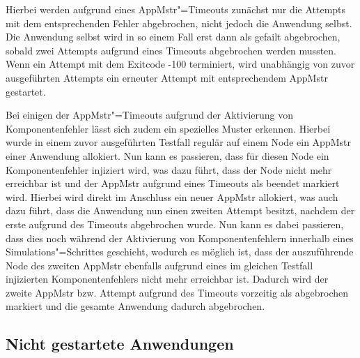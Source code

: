 Hierbei werden aufgrund eines \ac{AppMstr}"=Timeouts zunächst nur die Attempts mit dem entsprechenden Fehler abgebrochen, nicht jedoch die Anwendung selbst.
Die Anwendung selbst wird in so einem Fall erst dann als gefailt abgebrochen, sobald zwei Attempts aufgrund eines Timeouts abgebrochen werden mussten.
Wenn ein Attempt mit dem Exitcode -100 terminiert, wird unabhängig von zuvor ausgeführten Attempts ein erneuter Attempt mit entsprechendem \ac{AppMstr} gestartet.

Bei einigen der \ac{AppMstr}"=Timeouts aufgrund der Aktivierung von Komponentenfehler lässt sich zudem ein spezielles Muster erkennen.
Hierbei wurde in einem zuvor ausgeführten Testfall regulär auf einem Node ein \ac{AppMstr} einer Anwendung allokiert.
Nun kann es passieren, dass für diesen Node ein Komponentenfehler injiziert wird, was dazu führt, dass der Node nicht mehr erreichbar ist und der \ac{AppMstr} aufgrund eines Timeouts als beendet markiert wird.
Hierbei wird direkt im Anschluss ein neuer \ac{AppMstr} allokiert, was auch dazu führt, dass die Anwendung nun einen zweiten Attempt besitzt, nachdem der erste aufgrund des Timeouts abgebrochen wurde.
Nun kann es dabei passieren, dass dies noch während der Aktivierung von Komponentenfehlern innerhalb eines Simulations"=Schrittes geschieht, wodurch es möglich ist, dass der auszuführende Node des zweiten \ac{AppMstr} ebenfalls aufgrund eines im gleichen Testfall injizierten Komponentenfehlers nicht mehr erreichbar ist.
Dadurch wird der zweite \ac{AppMstr} bzw. Attempt aufgrund des Timeouts vorzeitig als abgebrochen markiert und die gesamte Anwendung dadurch abgebrochen.

\subsection{Nicht gestartete Anwendungen}
\label{sec:notStartedApps}


